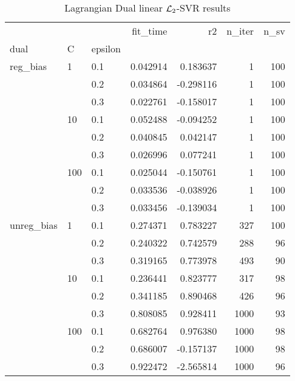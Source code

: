 \begin{table}[H]
\centering
\caption{Lagrangian Dual linear $\protect \mathcal{L}_2$-SVR results}
\label{linear_lagrangian_dual_l2_svr_cv_results}
\begin{tabular}{lllrrrr}
\toprule
           &     &     &  fit\_time &        r2 &  n\_iter &  n\_sv \\
dual & C & epsilon &           &           &         &       \\
\midrule
reg\_bias & 1   & 0.1 &  0.042914 &  0.183637 &       1 &   100 \\
           &     & 0.2 &  0.034864 & -0.298116 &       1 &   100 \\
           &     & 0.3 &  0.022761 & -0.158017 &       1 &   100 \\
           & 10  & 0.1 &  0.052488 & -0.094252 &       1 &   100 \\
           &     & 0.2 &  0.040845 &  0.042147 &       1 &   100 \\
           &     & 0.3 &  0.026996 &  0.077241 &       1 &   100 \\
           & 100 & 0.1 &  0.025044 & -0.150761 &       1 &   100 \\
           &     & 0.2 &  0.033536 & -0.038926 &       1 &   100 \\
           &     & 0.3 &  0.033456 & -0.139034 &       1 &   100 \\
unreg\_bias & 1   & 0.1 &  0.274371 &  0.783227 &     327 &   100 \\
           &     & 0.2 &  0.240322 &  0.742579 &     288 &    96 \\
           &     & 0.3 &  0.319165 &  0.773978 &     493 &    90 \\
           & 10  & 0.1 &  0.236441 &  0.823777 &     317 &    98 \\
           &     & 0.2 &  0.341185 &  0.890468 &     426 &    96 \\
           &     & 0.3 &  0.808085 &  0.928411 &    1000 &    93 \\
           & 100 & 0.1 &  0.682764 &  0.976380 &    1000 &    98 \\
           &     & 0.2 &  0.686007 & -0.157137 &    1000 &    98 \\
           &     & 0.3 &  0.922472 & -2.565814 &    1000 &    96 \\
\bottomrule
\end{tabular}
\end{table}
